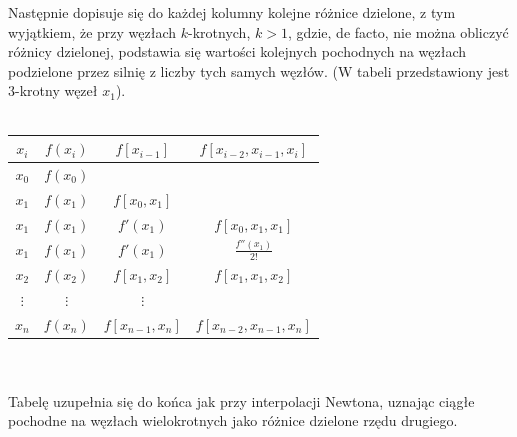 \documentclass[12pt]{article}
\begin{document}
    Następnie dopisuje się do każdej kolumny kolejne różnice dzielone, z tym wyjątkiem, że przy węzłach $k$-krotnych, $k>1$, gdzie, de facto, nie można obliczyć różnicy dzielonej, podstawia się wartości kolejnych pochodnych na węzłach podzielone przez silnię z liczby tych samych węzłów. (W tabeli przedstawiony jest $3$-krotny węzeł $x_{1}$).\\\\


    \begin{tabular}{|c|c|cc}
        \hline
        $x_i$ & $f(x_i)$ & \multicolumn{1}{c|}{$f[x_{i-1}]$}     & \multicolumn{1}{c|}{$f[x_{i-2},x_{i-1},x_i]$} \\ \hline
        $x_0$  & $f(x_0)$ & &                                            \\ \cline{1-3}
        $x_1$  & $f(x_1)$ & \multicolumn{1}{c|}{$f[x_0,x_1]$} &                                            \\ \hline
        $x_1$  & $f(x_1)$ & \multicolumn{1}{c|}{$f'(x_1)$}    & \multicolumn{1}{c|}{$f[x_0,x_1,x_1]$}      \\ \hline
        $x_1$  & $f(x_1)$ & \multicolumn{1}{c|}{$f'(x_1)$}    & \multicolumn{1}{c|}{$\frac{f''(x_1)}{2!}$} \\ \hline
        $x_2$  & $f(x_2)$ & \multicolumn{1}{c|}{$f[x_1,x_2]$} & \multicolumn{1}{c|}{$f[x_1,x_1,x_2]$}      \\ \hline
        $\vdots$ & $\vdots$   & \multicolumn{1}{c|}{$\vdots$}       &                                            \\ \hline
        $x_n$ & $f(x_n)$ & \multicolumn{1}{c|}{$f[x_{n-1},x_n]$} & \multicolumn{1}{c|}{$f[x_{n-2},x_{n-1},x_n]$} \\ \hline
    \end{tabular}\\\\

    Tabelę uzupełnia się do końca jak przy interpolacji Newtona, uznając ciągłe pochodne na węzłach wielokrotnych jako różnice dzielone rzędu drugiego.\\\\
\end{document}
